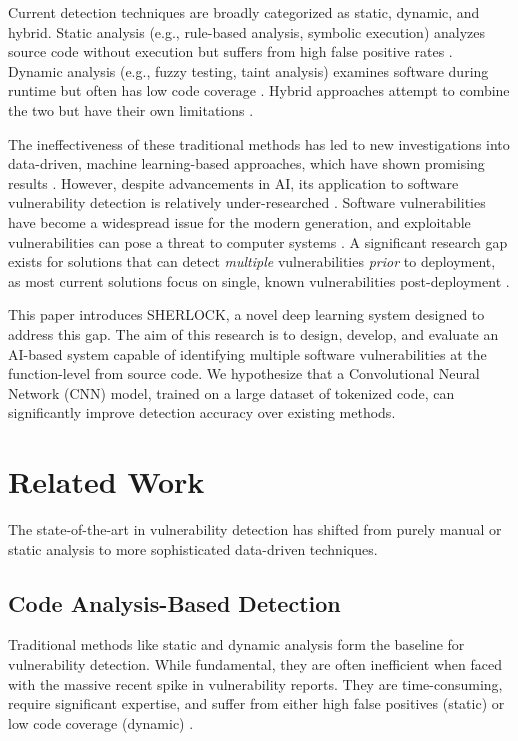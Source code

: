 \documentclass[conference]{IEEEtran}
\newcommand{\MYhyperreffix}{}
\let\MYhyperreffix\cite
\renewcommand{\cite}[1]{\MYhyperreffix{#1}}
\begin{document}
Current detection techniques are broadly categorized as static, dynamic, and hybrid. Static analysis (e.g., rule-based analysis, symbolic execution) analyzes source code without execution but suffers from high false positive rates \cite{lin_software_2020, cowan_stackguard_1998, pewny_leveraging_2014}. Dynamic analysis (e.g., fuzzy testing, taint analysis) examines software during runtime but often has low code coverage \cite{newsome_dynamic_2005}. Hybrid approaches attempt to combine the two but have their own limitations \cite{yamaguchi_modeling_2014}.

The ineffectiveness of these traditional methods has led to new investigations into data-driven, machine learning-based approaches, which have shown promising results \cite{lin_software_2020, sun_data-driven_2019, coulter_data-driven_2020}. However, despite advancements in AI, its application to software vulnerability detection is relatively under-researched \cite{ghaffarian_software_2018, sun_data-driven_2019}. Software vulnerabilities have become a widespread issue for the modern generation, and exploitable vulnerabilities can pose a threat to computer systems \cite{noauthor_heartbleed_2020}. A significant research gap exists for solutions that can detect \textit{multiple} vulnerabilities \textit{prior} to deployment, as most current solutions focus on single, known vulnerabilities post-deployment \cite{sonnekalb_deep_2021, ryan_project_2022, singh_cyber_2022}.

This paper introduces SHERLOCK, a novel deep learning system designed to address this gap. The aim of this research is to design, develop, and evaluate an AI-based system capable of identifying multiple software vulnerabilities at the function-level from source code. We hypothesize that a Convolutional Neural Network (CNN) model, trained on a large dataset of tokenized code, can significantly improve detection accuracy over existing methods.

\section{Related Work}
The state-of-the-art in vulnerability detection has shifted from purely manual or static analysis to more sophisticated data-driven techniques.

\subsection{Code Analysis-Based Detection}
Traditional methods like static and dynamic analysis form the baseline for vulnerability detection. While fundamental, they are often inefficient when faced with the massive recent spike in vulnerability reports. They are time-consuming, require significant expertise, and suffer from either high false positives (static) or low code coverage (dynamic) \cite{ghaffarian_software_2018, lin_software_2020, hanif_rise_2021}.
\end{document}
